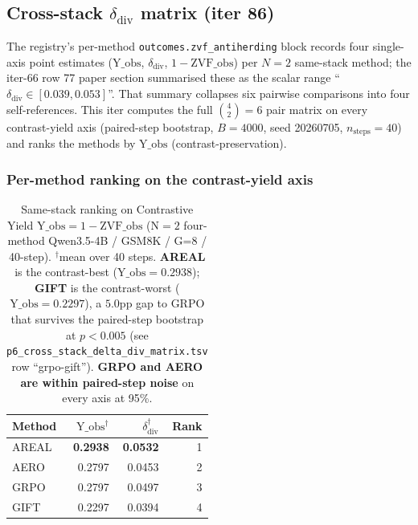 \subsection{Cross-stack \texorpdfstring{$\delta_{\mathrm{div}}$}{delta-div} matrix (iter 86)}
\label{sec:p6-iter86-cross-stack-matrix}

The registry's per-method \verb|outcomes.zvf_antiherding| block
records four single-axis point estimates
($\mathrm{Y\_obs}$, $\delta_{\mathrm{div}}$, $1-\mathrm{ZVF\_obs}$) per
$N\!=\!2$ same-stack method; the iter-66 row 77 paper section summarised
these as the scalar range ``$\delta_{\mathrm{div}} \in [0.039, 0.053]$''.
That summary collapses six pairwise comparisons into four self-references.
This iter computes the full $\binom{4}{2}=6$ pair matrix on every
contrast-yield axis (paired-step bootstrap, $B\!=\!4000$, seed
20260705, $n_{\mathrm{steps}}\!=\!40$) and ranks the methods by
$\mathrm{Y\_obs}$ (contrast-preservation).

\subsubsection{Per-method ranking on the contrast-yield axis}

\begin{table}[h]
\centering
\small
\begin{tabular}{l r r r}
\toprule
\textbf{Method} & $\mathrm{Y\_obs}^{\dagger}$ & $\delta_{\mathrm{div}}^{\dagger}$ & Rank \\
\midrule
AREAL & \textbf{0.2938} & \textbf{0.0532} & 1 \\
AERO  & 0.2797 & 0.0453 & 2 \\
GRPO  & 0.2797 & 0.0497 & 3 \\
GIFT  & 0.2297 & 0.0394 & 4 \\
\bottomrule
\end{tabular}
\caption{Same-stack ranking on Contrastive Yield
$\mathrm{Y\_obs}=1-\mathrm{ZVF\_obs}$
($\mathrm{N\!=\!2}$ four-method Qwen3.5-4B / GSM8K / G=8 / 40-step).
$^{\dagger}$mean over 40 steps.
\textbf{AREAL} is the contrast-best ($\mathrm{Y\_obs}=0.2938$);
\textbf{GIFT} is the contrast-worst ($\mathrm{Y\_obs}=0.2297$),
a $5.0$pp gap to GRPO that survives the paired-step bootstrap at $p<0.005$
(see \texttt{p6\_cross\_stack\_delta\_div\_matrix.tsv} row
``grpo-gift'').
\textbf{GRPO and AERO are within paired-step noise} on every axis at 95\%.}
\label{tab:p6-iter86-rank}
\end{table}

